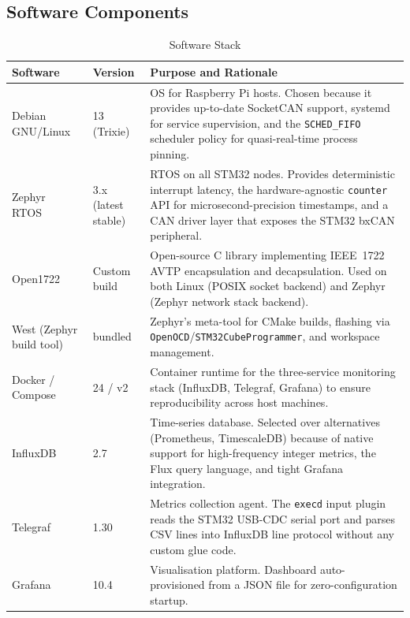 \documentclass[11pt,a4paper]{article}
\begin{document}
\subsection{Software Components}

\begin{table}[H]
    \centering
    \caption{Software Stack}
    \label{tab:software}
    \begin{tabularx}{\textwidth}{|l|l|X|}
        \hline
        \textbf{Software} & \textbf{Version} & \textbf{Purpose and Rationale} \\
        \hline
        Debian GNU/Linux~\cite{debian} & 13 (Trixie) &
            OS for Raspberry Pi hosts.  Chosen because it provides
            up-to-date SocketCAN support, systemd for service supervision,
            and the \texttt{SCHED\_FIFO} scheduler policy for
            quasi-real-time process pinning. \\
        \hline
        Zephyr RTOS~\cite{zephyr} & 3.x (latest stable) &
            RTOS on all STM32 nodes.  Provides deterministic interrupt
            latency, the hardware-agnostic \texttt{counter} API for
            microsecond-precision timestamps, and a CAN driver layer
            that exposes the STM32 bxCAN peripheral. \\
        \hline
        Open1722~\cite{open1722} & Custom build &
            Open-source C library implementing IEEE~1722 AVTP
            encapsulation and decapsulation.  Used on both Linux
            (POSIX socket backend) and Zephyr (Zephyr network stack
            backend). \\
        \hline
        West (Zephyr build tool) & bundled &
            Zephyr's meta-tool for CMake builds, flashing via
            \texttt{OpenOCD}/\texttt{STM32CubeProgrammer}, and
            workspace management. \\
        \hline
        Docker / Compose~\cite{docker} & 24 / v2 &
            Container runtime for the three-service monitoring stack
            (InfluxDB, Telegraf, Grafana) to ensure reproducibility
            across host machines. \\
        \hline
        InfluxDB~\cite{influxdb} & 2.7 &
            Time-series database.  Selected over alternatives (Prometheus,
            TimescaleDB) because of native support for high-frequency
            integer metrics, the Flux query language, and tight Grafana
            integration. \\
        \hline
        Telegraf~\cite{telegraf} & 1.30 &
            Metrics collection agent.  The \texttt{execd} input plugin
            reads the STM32 USB-CDC serial port and parses CSV lines
            into InfluxDB line protocol without any custom glue code. \\
        \hline
        Grafana~\cite{grafana} & 10.4 &
            Visualisation platform.  Dashboard auto-provisioned from a
            JSON file for zero-configuration startup. \\
        \hline
    \end{tabularx}
\end{table}
\end{document}
